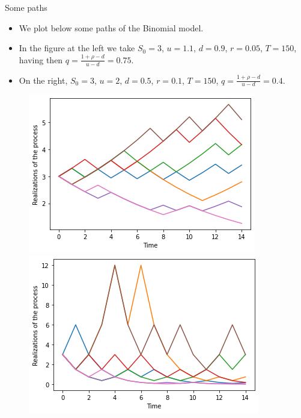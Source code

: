 \documentclass[9 pt]{beamer} %
\begin{document}
\begin{frame}{Some paths}
\begin{itemize}
\item We plot below some paths of the Binomial model.
\item In the figure at the left we take $S_0=3$, $u=1.1$, $d=0.9$, $r=0.05$, $T=150$, having then $q=\frac{1+\rho-d}{u-d}=0.75$. 
\item On the right, $S_0=3$, $u=2$, $d=0.5$, $r=0.1$, $T=150$, $q=\frac{1+\rho-d}{u-d}=0.4$.
\end{itemize}
 \begin{figure}
\centering
\begin{minipage}[b]{.5\textwidth}
  \centering
 \includegraphics[scale=0.4]{pathsu11.png}
\end{minipage}%
\begin{minipage}[b]{.5\textwidth}
  \centering
 \includegraphics[scale=0.4]{pathsu2.png}
\end{minipage}
\end{figure}
\end{frame}
\end{document}
